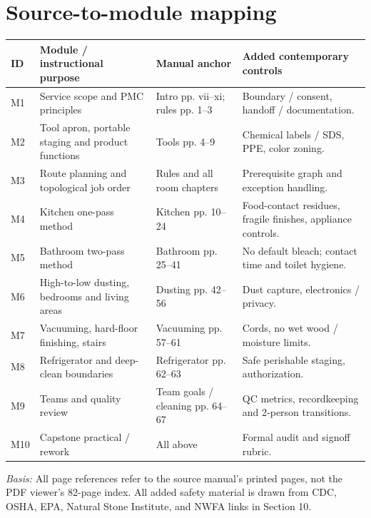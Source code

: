 \documentclass[10pt,letterpaper,oneside]{article}
\newcommand{\sources}[1]{\par{\small\color{graytext}\textit{Basis:} #1}\par}
\newcommand{\smalltable}{\par\small\renewcommand{\arraystretch}{1.24}}
\newcommand{\restorenormalfonttable}{\par\normalsize\renewcommand{\arraystretch}{1}}
\begin{document}
\section{Source-to-module mapping}
\smalltable\begin{longtable}{p{.07\linewidth}>{\raggedright\arraybackslash}p{.39\linewidth}>{\raggedright\arraybackslash}p{.18\linewidth}>{\raggedright\arraybackslash}p{.26\linewidth}}\toprule
ID & Module / instructional purpose & Manual anchor & Added contemporary controls\\\midrule\endhead
M1 & Service scope and PMC principles & Intro pp. vii--xi; rules pp. 1--3 & Boundary / consent, handoff / documentation.\\
M2 & Tool apron, portable staging and product functions & Tools pp. 4--9 & Chemical labels / SDS, PPE, color zoning.\\
M3 & Route planning and topological job order & Rules and all room chapters & Prerequisite graph and exception handling.\\
M4 & Kitchen one-pass method & Kitchen pp. 10--24 & Food-contact residues, fragile finishes, appliance controls.\\
M5 & Bathroom two-pass method & Bathroom pp. 25--41 & No default bleach; contact time and toilet hygiene.\\
M6 & High-to-low dusting, bedrooms and living areas & Dusting pp. 42--56 & Dust capture, electronics / privacy.\\
M7 & Vacuuming, hard-floor finishing, stairs & Vacuuming pp. 57--61 & Cords, no wet wood / moisture limits.\\
M8 & Refrigerator and deep-clean boundaries & Refrigerator pp. 62--63 & Safe perishable staging, authorization.\\
M9 & Teams and quality review & Team goals / cleaning pp. 64--67 & QC metrics, recordkeeping and 2-person transitions.\\
M10 & Capstone practical / rework & All above & Formal audit and signoff rubric.\\\bottomrule\end{longtable}\restorenormalfonttable
\sources{All page references refer to the source manual's printed pages, not the PDF viewer's 82-page index. All added safety material is drawn from CDC, OSHA, EPA, Natural Stone Institute, and NWFA links in Section 10.}
\end{document}
